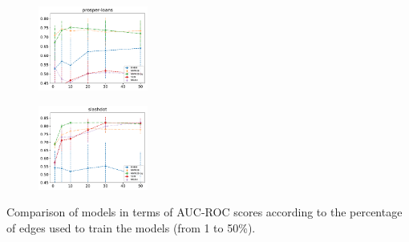 \begin{subfigure}
         \centering
      \includegraphics[width=0.32\textwidth]{fig/prosper-loans__entropy@_roc_evo2}
\end{subfigure}                                                             
\begin{subfigure}                                                           
         \centering                                                         
      \includegraphics[width=0.32\textwidth]{fig/slashdot__entropy@_roc_evo2}
\end{subfigure}                                                             
\caption{Comparison of models in terms of AUC-ROC scores according to the percentage of edges used to train the models (from 1 to 50\%).}

